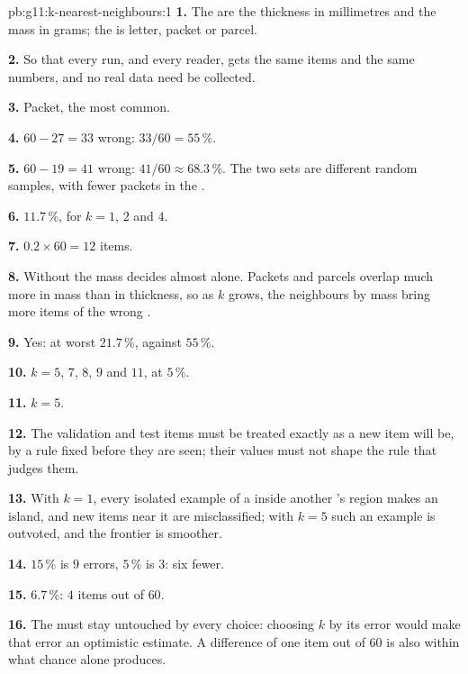 \begin{solution}{pb:g11:k-nearest-neighbours:1}
\textbf{1.} The  are the thickness in millimetres and the mass in grams; the  is letter, packet or
parcel.

\textbf{2.} So that every run, and every reader, gets the same items and the same numbers, and no real data need be
collected.

\textbf{3.} Packet, the most common.

\textbf{4.} $60 - 27 = 33$ wrong: $33/60 = 55\,\%$.

\textbf{5.} $60 - 19 = 41$ wrong: $41/60 \approx 68.3\,\%$. The two sets are different random samples, with fewer
packets in the .

\textbf{6.} $11.7\,\%$, for $k = 1$, $2$ and $4$.

\textbf{7.} $0.2 \times 60 = 12$ items.

\textbf{8.} Without  the mass decides almost alone. Packets and parcels overlap much more in mass than in
thickness, so as $k$ grows, the neighbours by mass bring more items of the wrong .

\textbf{9.} Yes: at worst $21.7\,\%$, against $55\,\%$.

\textbf{10.} $k = 5$, $7$, $8$, $9$ and $11$, at $5\,\%$.

\textbf{11.} $k = 5$.

\textbf{12.} The validation and test items must be treated exactly as a new item will be, by a rule fixed before
they are seen; their values must not shape the rule that judges them.

\textbf{13.} With $k = 1$, every isolated example of a  inside another 's region makes an island, and new
items near it are misclassified; with $k = 5$ such an example is outvoted, and the frontier is smoother.

\textbf{14.} $15\,\%$ is $9$ errors, $5\,\%$ is $3$: six fewer.

\textbf{15.} $6.7\,\%$: $4$ items out of $60$.

\textbf{16.} The  must stay untouched by every choice: choosing $k$ by its error would make that error an
optimistic estimate. A difference of one item out of $60$ is also within what chance alone produces.


\end{solution}
